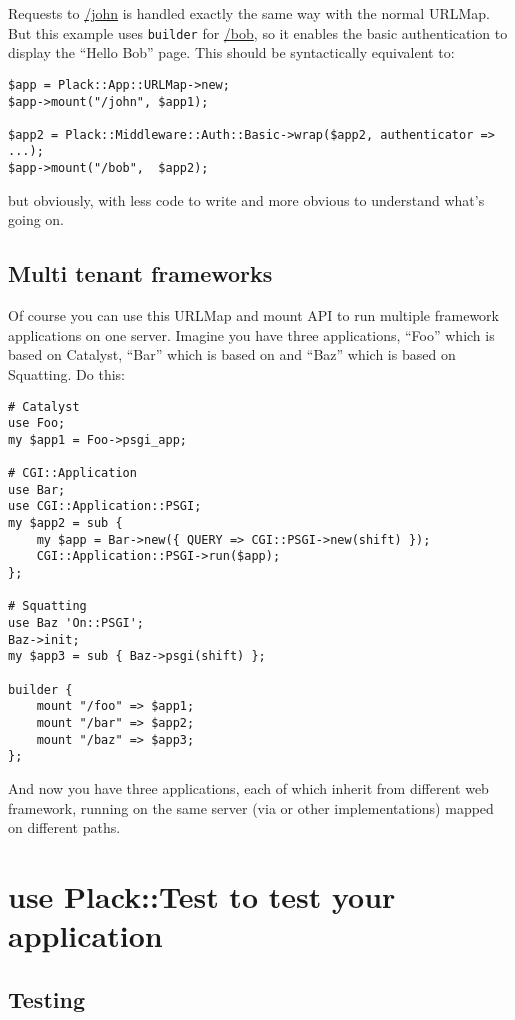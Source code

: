 Requests to \url{/john} is handled exactly the same way with the normal
URLMap. But this example uses \lstinline!builder! for \url{/bob}, so it
enables the basic authentication to display the ``Hello Bob'' page. This
should be syntactically equivalent to:

\begin{lstlisting}
$app = Plack::App::URLMap->new;
$app->mount("/john", $app1);

$app2 = Plack::Middleware::Auth::Basic->wrap($app2, authenticator => ...);
$app->mount("/bob",  $app2);
\end{lstlisting}
%
but obviously, with less code to write and more obvious to understand
what's going on.

\section{Multi tenant frameworks}\label{multi-tenant-frameworks}

Of course you can use this URLMap and mount API to run multiple
framework applications on one server. Imagine you have three
applications, ``Foo'' which is based on Catalyst, ``Bar'' which is based
on  and ``Baz'' which is based on Squatting. Do this:

\begin{lstlisting}
# Catalyst
use Foo;
my $app1 = Foo->psgi_app;

# CGI::Application
use Bar;
use CGI::Application::PSGI;
my $app2 = sub { 
    my $app = Bar->new({ QUERY => CGI::PSGI->new(shift) });
    CGI::Application::PSGI->run($app);
};

# Squatting
use Baz 'On::PSGI';
Baz->init;
my $app3 = sub { Baz->psgi(shift) };

builder {
    mount "/foo" => $app1;
    mount "/bar" => $app2;
    mount "/baz" => $app3;
};
\end{lstlisting}

And now you have three applications, each of which inherit from
different web framework, running on the same server (via  or
other  implementations) mapped on different paths.

\chapter{use Plack::Test to test your
application}\label{day-13-use-placktest-to-test-your-application}

\section{Testing}\label{testing}

